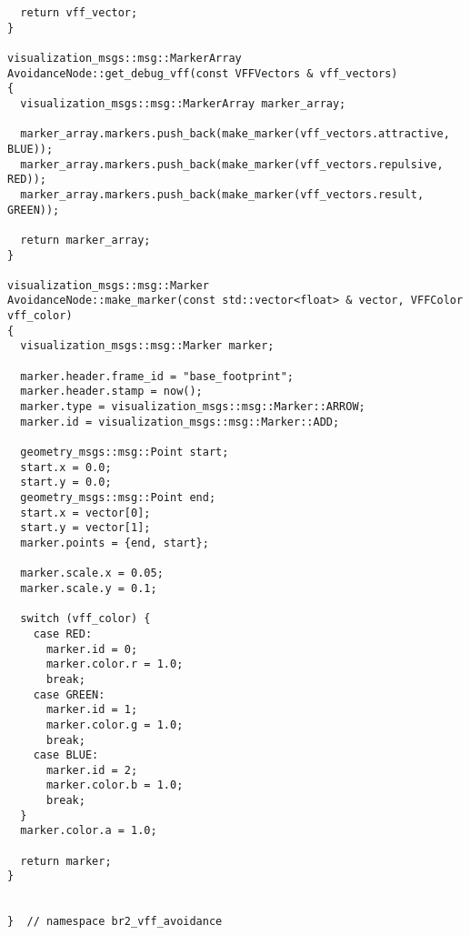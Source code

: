 \begin{tcolorbox}[sharp corners, colframe=gray!80, colback=LightGray, left=0pt, top=0pt, bottom=0pt, title=\texttt{br2\_vff\_avoidance/src/br2\_vff\_avoidance/AvoidanceNode.cpp}]
\begin{verbatim}
  return vff_vector;
}

visualization_msgs::msg::MarkerArray
AvoidanceNode::get_debug_vff(const VFFVectors & vff_vectors)
{
  visualization_msgs::msg::MarkerArray marker_array;

  marker_array.markers.push_back(make_marker(vff_vectors.attractive, BLUE));
  marker_array.markers.push_back(make_marker(vff_vectors.repulsive, RED));
  marker_array.markers.push_back(make_marker(vff_vectors.result, GREEN));

  return marker_array;
}

visualization_msgs::msg::Marker
AvoidanceNode::make_marker(const std::vector<float> & vector, VFFColor vff_color)
{
  visualization_msgs::msg::Marker marker;

  marker.header.frame_id = "base_footprint";
  marker.header.stamp = now();
  marker.type = visualization_msgs::msg::Marker::ARROW;
  marker.id = visualization_msgs::msg::Marker::ADD;

  geometry_msgs::msg::Point start;
  start.x = 0.0;
  start.y = 0.0;
  geometry_msgs::msg::Point end;
  start.x = vector[0];
  start.y = vector[1];
  marker.points = {end, start};

  marker.scale.x = 0.05;
  marker.scale.y = 0.1;

  switch (vff_color) {
    case RED:
      marker.id = 0;
      marker.color.r = 1.0;
      break;
    case GREEN:
      marker.id = 1;
      marker.color.g = 1.0;
      break;
    case BLUE:
      marker.id = 2;
      marker.color.b = 1.0;
      break;
  }
  marker.color.a = 1.0;

  return marker;
}


}  // namespace br2_vff_avoidance
    \end{verbatim}
    \end{tcolorbox}
  \normalsize

